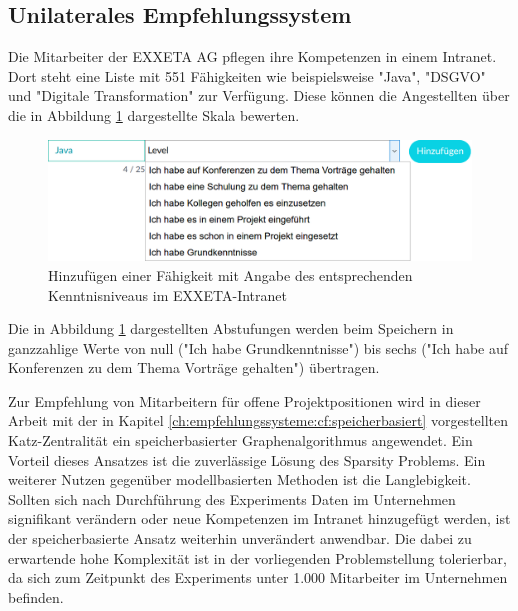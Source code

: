 \subsection{Unilaterales Empfehlungssystem}
\label{ch:methodik:versuchsaufbau:unilateral}
Die Mitarbeiter der EXXETA AG pflegen ihre Kompetenzen in einem Intranet. Dort steht eine Liste mit 551 Fähigkeiten wie beispielsweise "Java", "DSGVO" und "Digitale Transformation" zur Verfügung. Diese können die Angestellten über die in Abbildung \ref{fig:methodik:versuchsaufbau:daten:abb1} dargestellte Skala bewerten.

\begin{figure}[h]
	\centering
	\includegraphics[width=1\textwidth]{gfx/skill-level.png}
	\caption{Hinzufügen einer Fähigkeit mit Angabe des entsprechenden Kenntnisniveaus im EXXETA-Intranet}
	\label{fig:methodik:versuchsaufbau:daten:abb1}
\end{figure}

Die in Abbildung \ref{fig:methodik:versuchsaufbau:daten:abb1} dargestellten Abstufungen werden beim Speichern in ganzzahlige Werte von null ("Ich habe Grundkenntnisse") bis sechs ("Ich habe auf Konferenzen zu dem Thema Vorträge gehalten") übertragen.

Zur Empfehlung von Mitarbeitern für offene Projektpositionen wird in dieser Arbeit mit der in Kapitel \ref{ch:empfehlungssysteme:cf:speicherbasiert} vorgestellten Katz-Zentralität ein speicherbasierter Graphenalgorithmus angewendet. Ein Vorteil dieses Ansatzes ist die zuverlässige Lösung des Sparsity Problems. Ein weiterer Nutzen gegenüber modellbasierten Methoden ist die Langlebigkeit. Sollten sich nach Durchführung des Experiments Daten im Unternehmen signifikant verändern oder neue Kompetenzen im Intranet hinzugefügt werden, ist der speicherbasierte Ansatz weiterhin unverändert anwendbar. Die dabei zu erwartende hohe Komplexität ist in der vorliegenden Problemstellung tolerierbar, da sich zum Zeitpunkt des Experiments unter 1.000 Mitarbeiter im Unternehmen befinden.

